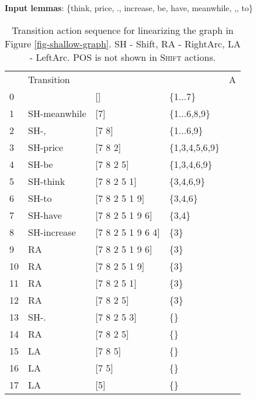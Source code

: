 \documentclass[11pt]{article}
\begin{document}
\begin{table}[t]
\centering
\scriptsize
\begin{tablenotes}
\item \textbf{Input lemmas}: \{think, price, ., increase,  be, have, meanwhile, ,, to\} 
\end{tablenotes}
\vspace*{0.5em}
\begin{tabular}{llp{1.5cm}p{1cm}l}
\hline
  & Transition     &     &      & A \\
0 &                & []          & \{1...7\} &                  \\ 
1 & {\sc SH}-meanwhile    & [7]         & \{1...6,8,9\} &                             \\ 2 & {\sc SH}-,    & [7 8]         & \{1...6,9\} &                             \\ 3 & {\sc SH}-price    & [7 8 2]       & \{1,3,4,5,6,9\} &                             \\ 4 & {\sc SH}-be    & [7 8 2 5]     & \{1,3,4,6,9\} &                             \\ 5 & {\sc SH}-think    & [7 8 2 5 1]   & \{3,4,6,9\}   &                             \\ 6 & {\sc SH}-to    & [7 8 2 5 1 9]   & \{3,4,6\}   &                             \\ 7 & {\sc SH}-have    & [7 8 2 5 1 9 6]   & \{3,4\}   &                             \\ 8 & {\sc SH}-increase    & [7 8 2 5 1 9 6 4]   & \{3\}   &                             \\ 9 & {\sc RA} & [7 8 2 5 1 9 6]   & \{3\}    &  \\ 10 & {\sc RA} & [7 8 2 5 1 9]   & \{3\}     &  \\ 11 & {\sc RA} & [7 8 2 5 1]     & \{3\}     &  \\ 12 & {\sc RA} & [7 8 2 5]       & \{3\}     &  \\ 13 & {\sc SH}-.    & [7 8 2 5 3]     & \{\}      &                             \\ 14& {\sc RA} & [7 8 2 5]       & \{\}      &  \\ 15& {\sc LA}  & [7 8 5]         & \{\}      &   \\ 16& {\sc LA}  & [7 5]         & \{\}      &   \\ 17& {\sc LA}  & [5]         & \{\}      &   \\ 

\hline
\end{tabular}
\caption{Transition action sequence for linearizing the graph in Figure \ref{fig-shallow-graph}. SH  - {\sc Shift}, RA - {\sc RightArc}, LA - {\sc LeftArc}. POS is not shown in \textsc{Shift} actions.}
\label{tbl:arc-standard-shallow-linearization}
\vspace*{-0.5em}
\end{table}	
  
\end{document}

